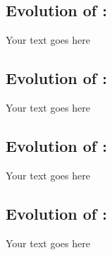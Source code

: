 \documentclass[a4paper, 11pt]{report}
\begin{document}
\subsection{Evolution of \majA: \studA}

Your text goes here

\subsection{Evolution of \majB: \studB}

Your text goes here

\subsection{Evolution of \majC: \studC}

Your text goes here

\subsection{Evolution of \majD: \studD}

Your text goes here




\newpage



\end{document}
